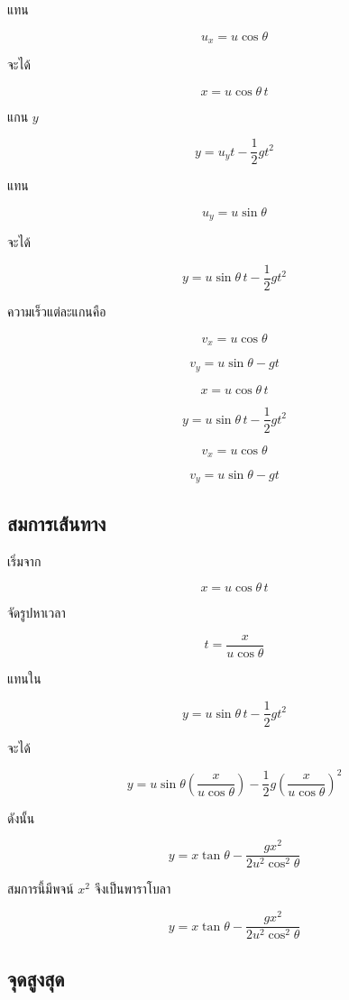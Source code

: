 แทน

\[
u_x=u\cos\theta
\]

จะได้

\[
x=u\cos\theta\,t
\]

แกน $y$

\[
y=u_yt-\frac{1}{2}gt^2
\]

แทน

\[
u_y=u\sin\theta
\]

จะได้

\[
y=u\sin\theta\,t-\frac{1}{2}gt^2
\]

ความเร็วแต่ละแกนคือ

\[
v_x=u\cos\theta
\]

\[
v_y=u\sin\theta-gt
\]

\begin{tcolorbox}[title=สมการโพรเจคไทล์]
\[
x=u\cos\theta\,t
\]

\[
y=u\sin\theta\,t-\frac{1}{2}gt^2
\]

\[
v_x=u\cos\theta
\]

\[
v_y=u\sin\theta-gt
\]
\end{tcolorbox}

\subsection{สมการเส้นทาง}

เริ่มจาก

\[
x=u\cos\theta\,t
\]

จัดรูปหาเวลา

\[
t=\frac{x}{u\cos\theta}
\]

แทนใน

\[
y=u\sin\theta\,t-\frac{1}{2}gt^2
\]

จะได้

\[
y=u\sin\theta\left(\frac{x}{u\cos\theta}\right)
-\frac{1}{2}g\left(\frac{x}{u\cos\theta}\right)^2
\]

ดังนั้น

\[
y=x\tan\theta-\frac{gx^2}{2u^2\cos^2\theta}
\]

สมการนี้มีพจน์ $x^2$ จึงเป็นพาราโบลา

\begin{tcolorbox}[title=สมการเส้นทางของโพรเจคไทล์]
\[
y=x\tan\theta-\frac{gx^2}{2u^2\cos^2\theta}
\]
\end{tcolorbox}

\subsection{จุดสูงสุด}

